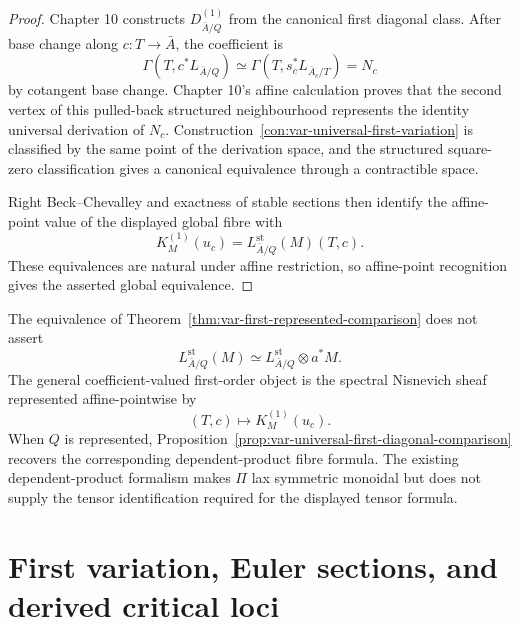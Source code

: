 \begin{proof}
Chapter 10 constructs \(D^{(1)}_{\bar A/Q}\) from the canonical first diagonal class. After base change along \(c:T\to\bar A\), the coefficient is
\[
    \Gamma(T,c^*L_{\bar A/Q})
    \simeq
    \Gamma(T,s_c^*L_{\bar A_c/T})
    =
    N_c
\]
by cotangent base change. Chapter 10's affine calculation proves that the second vertex of this pulled-back structured neighbourhood represents the identity universal derivation of \(N_c\). Construction~\ref{con:var-universal-first-variation} is classified by the same point of the derivation space, and the structured square-zero classification gives a canonical equivalence through a contractible space.

Right Beck--Chevalley and exactness of stable sections then identify the affine-point value of the displayed global fibre with
\[
    K_M^{(1)}(u_c)
    =
    L^{\mathrm{st}}_{\bar A/Q}(M)(T,c).
\]
These equivalences are natural under affine restriction, so affine-point recognition gives the asserted global equivalence.
\end{proof}

\begin{remark}
\label{rem:var-no-coeff-tensor-cotangent}
The equivalence of Theorem~\ref{thm:var-first-represented-comparison} does not assert
\[
    L^{\mathrm{st}}_{\bar A/Q}(M)
    \simeq
    L^{\mathrm{st}}_{\bar A/Q}\otimes a^*M.
\]
The general coefficient-valued first-order object is the spectral Nisnevich sheaf represented affine-pointwise by
\[
    (T,c)\longmapsto K_M^{(1)}(u_c).
\]
When \(Q\) is represented, Proposition~\ref{prop:var-universal-first-diagonal-comparison} recovers the corresponding dependent-product fibre formula. The existing dependent-product formalism makes \(\Pi\) lax symmetric monoidal but does not supply the tensor identification required for the displayed tensor formula.
\end{remark}

\section{First variation, Euler sections, and derived critical loci}
\label{sec:var-euler-lagrange}

